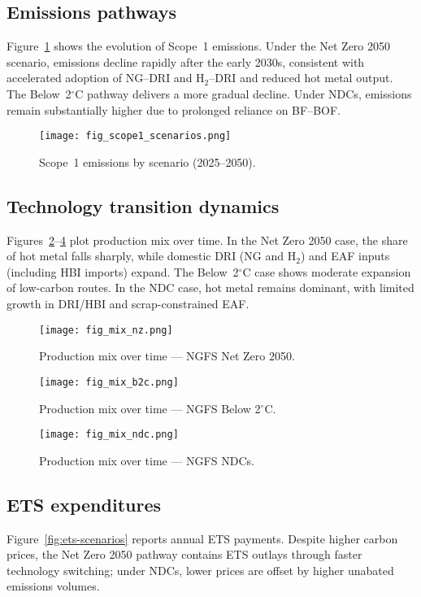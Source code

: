 \documentclass[preprint,5p,authoryear]{elsarticle}
\begin{document}


\subsection{Emissions pathways}
Figure~\ref{fig:scope1-scenarios} shows the evolution of Scope~1 emissions. Under the Net Zero 2050 scenario, emissions decline rapidly after the early 2030s, consistent with accelerated adoption of NG--DRI and H$_2$--DRI and reduced hot metal output. The Below~2$^\circ$C pathway delivers a more gradual decline. Under NDCs, emissions remain substantially higher due to prolonged reliance on BF--BOF.

\begin{figure}[!t]
  \centering
  \texttt{[image: fig\_scope1\_scenarios.png]}
  \caption{Scope~1 emissions by scenario (2025--2050).}
  \label{fig:scope1-scenarios}
\end{figure}

\subsection{Technology transition dynamics}
Figures~\ref{fig:mix-nz}--\ref{fig:mix-ndc} plot production mix over time. In the Net Zero 2050 case, the share of hot metal falls sharply, while domestic DRI (NG and H$_2$) and EAF inputs (including HBI imports) expand. The Below~2$^\circ$C case shows moderate expansion of low-carbon routes. In the NDC case, hot metal remains dominant, with limited growth in DRI/HBI and scrap-constrained EAF.

\begin{figure}[!t]
  \centering
  \texttt{[image: fig\_mix\_nz.png]}
  \caption{Production mix over time --- NGFS Net Zero 2050.}
  \label{fig:mix-nz}
\end{figure}

\begin{figure}[!t]
  \centering
  \texttt{[image: fig\_mix\_b2c.png]}
  \caption{Production mix over time --- NGFS Below 2$^\circ$C.}
  \label{fig:mix-b2c}
\end{figure}

\begin{figure}[!t]
  \centering
  \texttt{[image: fig\_mix\_ndc.png]}
  \caption{Production mix over time --- NGFS NDCs.}
  \label{fig:mix-ndc}
\end{figure}

\subsection{ETS expenditures}
Figure~\ref{fig:ets-scenarios} reports annual ETS payments. Despite higher carbon prices, the Net Zero 2050 pathway contains ETS outlays through faster technology switching; under NDCs, lower prices are offset by higher unabated emissions volumes.
\end{document}
